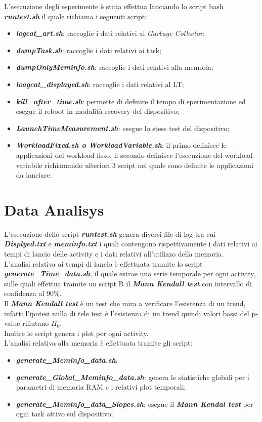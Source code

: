 L'esecuzione degli esperimente è stata effettua lanciando lo script bash
\textit{\textbf{runtest.sh}} il quale richiama i seguenti script:
  \begin{itemize}
    \item \textit{\textbf{logcat\_art.sh}}: raccoglie i dati relativi al \textit{Garbage Collector};
    \item \textit{\textbf{dumpTask.sh}}: raccoglie i dati relativi ai task;
    \item \textit{\textbf{dumpOnlyMeminfo.sh}}: raccoglie i dati relativi alla memoria;
    \item \textit{\textbf{loagcat\_displayed.sh}}: raccoglie i dati relativi al LT;
    \item \textit{\textbf{kill\_after\_time.sh}}: permette di definire il tempo di
    sperimentazione ed esegue il reboot in modalità recovery del dispositivo;
    \item \textit{\textbf{LaunchTimeMeasurement.sh}}: esegue lo stess test del dispositivo;
    \item \textit{\textbf{WorkloadFixed.sh o WorkloadVariable.sh}}: il primo definisce le applicazioni del
    workload fisso, il secondo definisce l'esecuzione del workload variabile richiamando
    ulteriori 3 script nel quale sono definite le applicazioni da lanciare.
  \end{itemize}

\section{Data Analisys}

L'esecuzione dello script \textbf{\textit{runtest.sh}} genera diversi file di log
tra cui \textit{\textbf{Displyed.txt}} e \textit{\textbf{meminfo.txt}} i quali
contengono rispettivamente i dati relativi ai tempi di lancio delle activity e
i dati relativi all'utilizzo della memoria.\\
L'analisi relativa ai tempi di lancio è effettuata tramite lo script \textbf{\textit{generate\_Time\_data.sh}},
il quale estrae una serie temporale per ogni activity, sulle quali effettua
tramite un script R il \textbf{\textit{Mann Kendall test}} con intervallo
di confidenza al 90\%.\\
Il \textbf{\textit{Mann Kendall test}} è un test che mira a verificare l'esistenza
di un trend, infatti l'ipotesi nulla di tele test è l'esistenza di un trend quindi
valori bassi del p-value rifiutano $H_0$.\\
Inoltre lo script genera i plot per ogni activity.\\
L'analisi relativa alla memoria è effettuata tramite gli script:
\begin{itemize}
  \item \textit{\textbf{generate\_Meminfo\_data.sh}}:
  \item \textit{\textbf{generate\_Global\_Meminfo\_data.sh}}: genera le statistiche
  globali per i parametri di memoria RAM e i relativi plot temporali;
  \item \textit{\textbf{generate\_Meminfo\_data\_Slopes.sh}}: esegue il \textbf{\textit{Mann Kendal test}}
  per ogni task attivo sul dispositivo;
\end{itemize}

